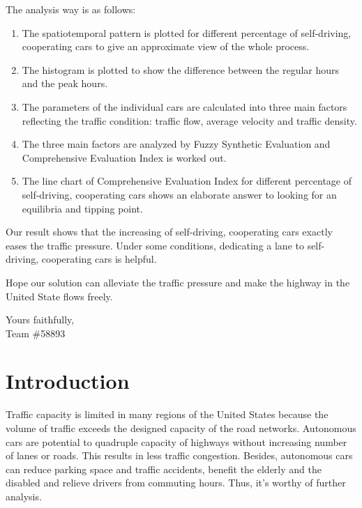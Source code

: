 \documentclass[a4paper]{article}
\begin{document}
\begin{spacing}{1.4}
		The analysis way is as follows:
		\begin{enumerate}
			\item The spatiotemporal pattern is plotted for different percentage of self-driving, cooperating cars to give an approximate view of the whole process. 
			\item  The histogram is plotted to show the difference between the regular hours and the peak hours.
			\item  The parameters of the individual cars are calculated into three main factors reflecting the traffic condition: traffic flow, average velocity and traffic density.
			\item  The three main factors are analyzed by Fuzzy Synthetic Evaluation and Comprehensive Evaluation Index is worked out.
			\item  The line chart of Comprehensive Evaluation Index for different percentage of self-driving, cooperating cars shows an elaborate answer to looking for an equilibria and tipping point. 
		\end{enumerate}
		
		Our result shows that the increasing of self-driving, cooperating cars exactly eases the traffic pressure. Under some conditions, dedicating a lane to self-driving, cooperating cars is helpful. 
		
		Hope our solution can alleviate the traffic pressure and make the highway in the United State flows freely.
		
		\begin{flushleft}
			Yours faithfully,\\
			Team \#58893
		\end{flushleft}
		
	\end{spacing}
	
	
	\newpage
	\tableofcontents
	\newpage
	
	\section{Introduction}
	Traffic capacity is limited in many regions of the United States because the volume of traffic exceeds the designed capacity of the road networks. Autonomous cars are potential to quadruple capacity of highways without increasing number of lanes or roads. This results in less traffic congestion. Besides, autonomous cars can reduce parking space and traffic accidents, benefit the elderly and the disabled and relieve drivers from commuting hours. Thus, it’s worthy of further analysis. 
	
\end{document}
